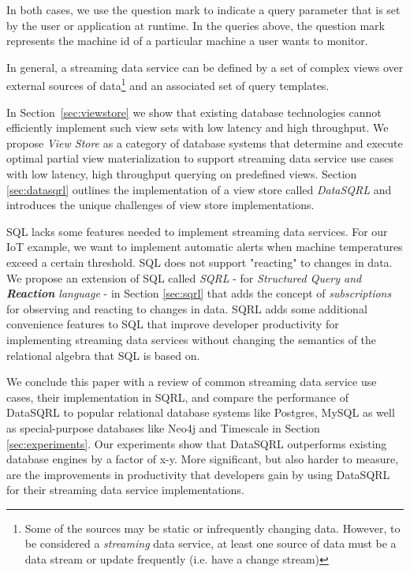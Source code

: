\documentclass[	DIV=calc,%
							paper=letter,%
							fontsize=11pt,%
							twocolumn]{scrartcl}	 					%
\begin{document}
In both cases, we use the question mark to indicate a query parameter that is set by the user or application at runtime. In the queries above, the question mark represents the machine id of a particular machine a user wants to monitor.

In general, a streaming data service can be defined by a set of complex views over external sources of data\footnote{Some of the sources may be static or infrequently changing data. However, to be considered a \emph{streaming} data service, at least one source of data must be a data stream or update frequently (i.e. have a change stream)} and an associated set of query templates.

In Section~\ref{sec:viewstore} we show that existing database technologies cannot efficiently implement such view sets with low latency and high throughput. We propose \emph{View Store} as a category of database systems that determine and execute optimal partial view materialization to support streaming data service use cases with low latency, high throughput querying on predefined views. Section \ref{sec:datasqrl} outlines the implementation of a view store called \emph{DataSQRL} and introduces the unique challenges of view store implementations.

SQL lacks some features needed to implement streaming data services. For our IoT example, we want to implement automatic alerts when machine temperatures exceed a certain threshold. SQL does not support "reacting" to changes in data. We propose an extension of SQL called \emph{SQRL} - for \emph{Structured Query and \textbf{Reaction} language} - in Section \ref{sec:sqrl} that adds the concept of \emph{subscriptions} for observing and reacting to changes in data. SQRL adds some additional convenience features to SQL that improve developer productivity for implementing streaming data services without changing the semantics of the relational algebra that SQL is based on.

We conclude this paper with a review of common streaming data service use cases, their implementation in SQRL, and compare the performance of DataSQRL to popular relational database systems like Postgres, MySQL as well as special-purpose databases like Neo4j and Timescale in Section \ref{sec:experiments}. Our experiments show that DataSQRL outperforms existing database engines by a factor of x-y. More significant, but also harder to measure, are the improvements in productivity that developers gain by using DataSQRL for their streaming data service implementations.
\end{document}
